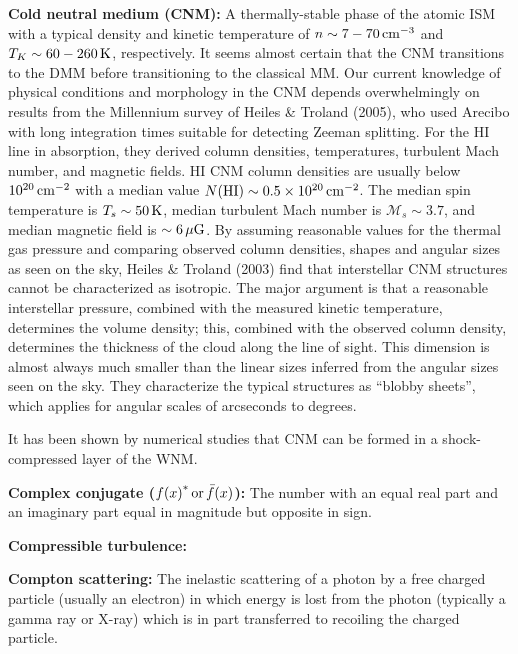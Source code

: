 \documentclass[a4paper,10pt]{article}
\begin{document}
{\noindent}\textbf{Cold neutral medium (CNM):} A thermally-stable phase of the atomic ISM with a typical density and kinetic temperature of $n\sim7-70\,{\rm cm^{-3}}$ and $T_K\sim60-260\,{\rm K}$, respectively. It seems almost certain that the CNM transitions to the DMM before transitioning to the classical MM. Our current knowledge of physical conditions and morphology in the CNM depends overwhelmingly on results from the Millennium survey of Heiles \& Troland (2005), who used Arecibo with long integration times suitable for detecting Zeeman splitting. For the HI line in absorption, they derived column densities, temperatures, turbulent Mach number, and magnetic fields. HI CNM column densities are usually below $10^{20}\,{\rm cm^{-2}}$ with a median value $N({\rm HI})\sim0.5\times10^{20}\,{\rm cm^{-2}}$. The median spin temperature is $T_s\sim50\,{\rm K}$, median turbulent Mach number is $\mathcal{M}_s\sim3.7$, and median magnetic field is $\sim6\,\mu{\rm G}$. By assuming reasonable values for the thermal gas pressure and comparing observed column densities, shapes and angular sizes as seen on the sky, Heiles \& Troland (2003) find that interstellar CNM structures cannot be characterized as isotropic. The major argument is that a reasonable interstellar pressure, combined with the measured kinetic temperature, determines the volume density; this, combined with the observed column density, determines the thickness of the cloud along the line of sight. This dimension is almost always much smaller than the linear sizes inferred from the angular sizes seen on the sky. They characterize the typical structures as ``blobby sheets'', which applies for angular scales of arcseconds to degrees.

{\noindent}It has been shown by numerical studies that CNM can be formed in a shock-compressed layer of the WNM.

{\noindent}\textbf{Complex conjugate (${f(x)}^*\,{\rm or}\,\bar{f}(x)$):} The number with an equal real part and an imaginary part equal in magnitude but opposite in sign.

{\noindent}\textbf{Compressible turbulence:}

{\noindent}\textbf{Compton scattering:} The inelastic scattering of a photon by a free charged particle (usually an electron) in which energy is lost from the photon (typically a gamma ray or X-ray) which is in part transferred to recoiling the charged particle.
\end{document}
